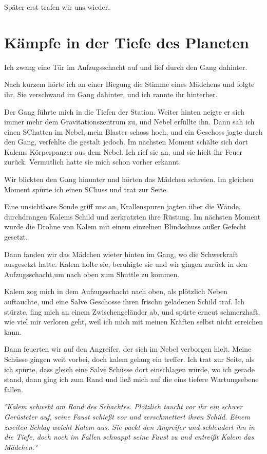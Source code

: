 \documentclass[11pt]{article}
\begin{document}
Später erst trafen wir uns wieder.

\section{Kämpfe in der Tiefe des Planeten}

Ich zwang eine Tür im Aufzugsschacht auf und lief durch den Gang
dahinter.

Nach kurzem hörte ich an einer Biegung die Stimme eines Mädchens und
folgte ihr. Sie verschwand im Gang dahinter, und ich rannte ihr
hinterher.

Der Gang führte mich in die Tiefen der Station. Weiter hinten neigte er
sich immer mehr dem Gravitationszentrum zu, und Nebel erfüllte ihn. Dann
sah ich einen SChatten im Nebel, mein Blaster schoss hoch, und ein
Geschoss jagte durch den Gang, verfehlte die gestalt jedoch. Im nächsten
Moment schälte sich dort Kalems Körperpanzer aus dem Nebel. Ich rief sie
an, und sie hielt ihr Feuer zurück. Vermutlich hatte sie mich schon
vorher erkannt.

Wir blickten den Gang hinunter und hörten das Mädchen schreien. Im
gleichen Moment spürte ich einen SChuss und trat zur Seite.

Eine unsichtbare Sonde griff uns an, Krallenspuren jagten über die
Wände, durchdrangen Kalems Schild und zerkratzten ihre Rüstung. Im
nächsten Moment wurde die Drohne von Kalem mit einem einzelnen
Blindschuss außer Gefecht gesetzt.

Dann fanden wir das Mädchen wieter hinten im Gang, wo die Schwerkraft
ausgesetzt hatte. Kalem holte sie, beruhigte sie und wir gingen zurück
in den Aufzugsschacht,um nach oben zum Shuttle zu kommen.

Kalem zog mich in dem Aufzugsschacht nach oben, als plötzlich Neben
auftauchte, und eine Salve Geschosse ihren frischn geladenen Schild
traf. Ich stürzte, fing mich an einem Zwischengeländer ab, und spürte
erneut schmerzhaft, wie viel mir verloren geht, weil ich mich mit meinen
Kräften selbst nicht erreichen kann.

Dann feuerten wir auf den Angreifer, der sich im Nebel verborgen hielt.
Meine Schüsse gingen weit vorbei, doch kalem gelang ein treffer. Ich
trat zur Seite, als ich spürte, dass gleich eine Salve Schüsse dort
einschlagen würde, wo ich gerade stand, dann ging ich zum Rand und ließ
mich auf die eins tiefere Wartungsebene fallen.

\emph{°Kalem schwebt am Rand des Schachtes. Plötzlich taucht vor ihr ein
schwer Gerüsteter auf, seine Faust schießt vor und zerschmettert ihren
Schild. Einem zweiten Schlag weicht Kalem aus. Sie packt den Angreifer
und schleudert ihn in die Tiefe, doch noch im Fallen schnappt seine
Faust zu und entreißt Kalem das Mädchen.°}
\end{document}
